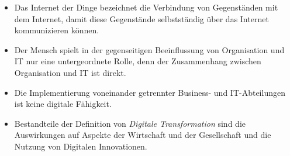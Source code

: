 \documentclass[12pt,a4paper]{article}
\begin{document}
\begin{itemize}
   \item Das Internet der Dinge bezeichnet die Verbindung von Gegenständen mit dem Internet, damit diese Gegenstände selbstständig über das Internet kommunizieren können.
   
   \item Der Mensch spielt in der gegenseitigen Beeinflussung von Organisation und IT nur eine untergeordnete Rolle, denn der Zusammenhang zwischen Organisation und IT ist direkt.
   
   \item Die Implementierung voneinander getrennter Business- und IT-Abteilungen ist keine digitale Fähigkeit.
   
   \item Bestandteile der Definition von \emph{Digitale Transformation} sind die Auswirkungen auf Aspekte der Wirtschaft und der Gesellschaft und die Nutzung von Digitalen Innovationen.
\end{itemize}
\end{document}

